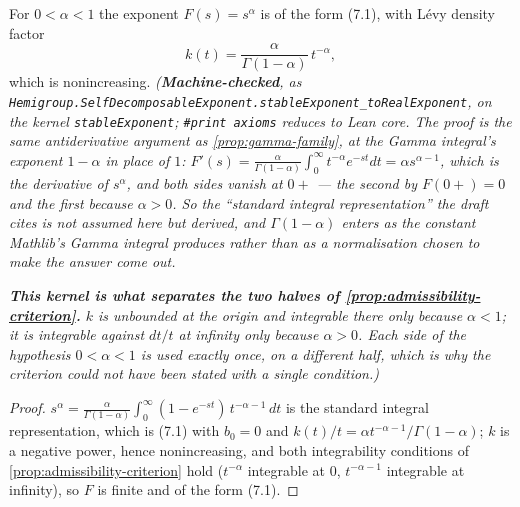 \begin{proposition}\label{prop:stable-family}
\leanok
For $0 < \alpha < 1$ the exponent $F(s) = s^\alpha$ is of the form (7.1), with Lévy density
factor
\[
  k(t) = \frac{\alpha}{\Gamma(1-\alpha)}\, t^{-\alpha},
\]
which is nonincreasing.
\statusT\quad\emph{(\textbf{Machine-checked}, as
\texttt{Hemigroup.SelfDecomposableExponent.stableExponent\_toRealExponent}, on the kernel
\texttt{stableExponent}; \texttt{\#print axioms} reduces to Lean core. The proof is the same
antiderivative argument as \ref{prop:gamma-family}, at the Gamma integral's exponent $1-\alpha$
in place of $1$: $F'(s) = \frac{\alpha}{\Gamma(1-\alpha)}\int_0^\infty t^{-\alpha}e^{-st}dt =
\alpha s^{\alpha-1}$, which is the derivative of $s^\alpha$, and both sides vanish at $0{+}$ ---
the second by $F(0{+}) = 0$ and the first because $\alpha > 0$. So the ``standard integral
representation'' the draft cites is not assumed here but derived, and $\Gamma(1-\alpha)$ enters
as the constant Mathlib's Gamma integral produces rather than as a normalisation chosen to make
the answer come out.}

\emph{\textbf{This kernel is what separates the two halves of
\ref{prop:admissibility-criterion}.} $k$ is \emph{unbounded} at the origin and integrable there
only because $\alpha < 1$; it is integrable against $dt/t$ at infinity only because
$\alpha > 0$. Each side of the hypothesis $0 < \alpha < 1$ is used exactly once, on a different
half, which is why the criterion could not have been stated with a single condition.)}
\end{proposition}

\begin{proof}
\leanok
$s^\alpha = \frac{\alpha}{\Gamma(1-\alpha)}\int_0^\infty (1 - e^{-st})\,t^{-\alpha-1}\,dt$ is
the standard integral representation, which is (7.1) with $b_0 = 0$ and
$k(t)/t = \alpha t^{-\alpha-1}/\Gamma(1-\alpha)$; $k$ is a negative power, hence
nonincreasing, and both integrability conditions of \ref{prop:admissibility-criterion} hold
($t^{-\alpha}$ integrable at $0$, $t^{-\alpha-1}$ integrable at infinity), so $F$ is finite and
of the form (7.1).
\end{proof}

